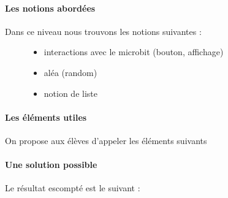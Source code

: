 \documentclass[letterpaper,10pt,french]{sphinxmanual}
\begin{document}
\paragraph{Les notions abordées}
\label{\detokenize{decouverte/pileface-python1:les-notions-abordees}}\begin{description}
\item[{Dans ce niveau nous trouvons les notions suivantes :}] \leavevmode\begin{itemize}
\item {} 
interactions avec le microbit (bouton, affichage)

\item {} 
aléa (random)

\item {} 
notion de liste

\end{itemize}

\end{description}


\paragraph{Les éléments utiles}
\label{\detokenize{decouverte/pileface-python1:les-elements-utiles}}
On propose aux élèves d’appeler les éléments suivants

%
\begin{sphinxVerbatim}[commandchars=\\\{\}]
  
 
    
\PYG{p}{[} \PYG{p}{]}    
\end{sphinxVerbatim}


\paragraph{Une solution possible}
\label{\detokenize{decouverte/pileface-python1:une-solution-possible}}
Le résultat escompté est le suivant :
\end{document}
